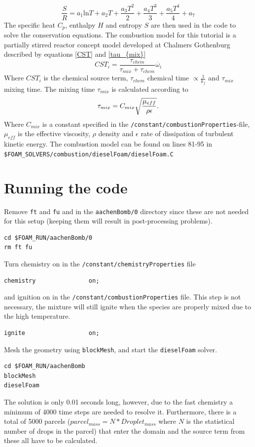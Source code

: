 \documentclass{report}
\begin{document}
\begin{equation}
\label{S}
 \frac{S}{R}  = a_1 \text{ln}T + a_{2} T + \frac{a_{3} T^2}{2} + \frac{a_4 T^3 }{3} + \frac{a_5 T^4}{4} + a_7
\end{equation}
The specific heat $C_{p}$, enthalpy $H$ and entropy $S$ are then used in the code to solve the conservation equations.
\newline
\newline
\noindent
The combustion model for this tutorial is a partially stirred reactor concept model developed at Chalmers Gothenburg described by equations \ref{CST} and \ref{tau_{mix}}
\begin{equation}
\label{CST}
	CST_{i}=\frac{\tau_{chem}}{\tau_{mix}+\tau_{chem}}\dot{\omega_i}
\end{equation}
Where $CST_{i}$ is the chemical source term, $\tau_{chem}$ chemical time $\propto \frac{1}{k_{f}}$ and $\tau_{mix}$ mixing time.
The mixing time $\tau_{mix}$ is calculated according to 
\begin{equation}
\label{tau_{mix}}
	\tau_{mix}= C_{mix}\sqrt{\frac{\mu_{eff}}{\rho  \epsilon}}.
\end{equation}
Where $C_{mix}$ is a constant specified in the \verb+/constant/combustionProperties+-file,  $\mu_{eff}$ is the effective viscosity, $\rho$ density and $\epsilon$ rate of dissipation of turbulent kinetic energy. The combustion model can be found on lines 81-95 in \verb+$FOAM_SOLVERS/combustion/dieselFoam/dieselFoam.C+


\section{Running the code}
Remove \verb+ft+ and \verb+fu+ and in the \verb+aachenBomb/0+ directory since these are not needed for this setup (keeping them will result in post-processing problems).  
\begin{verbatim}
cd $FOAM_RUN/aachenBomb/0
rm ft fu 
\end{verbatim} 
Turn chemistry on in the \verb+/constant/chemistryProperties+ file
\begin{verbatim}
chemistry               on;
\end{verbatim} 
\noindent
and ignition on in the \verb+/constant/combustionProperties+  file. This step is not necessary, the mixture will still ignite when the species are properly mixed due to the high temperature. 
\begin{verbatim}
ignite              	on;
\end{verbatim} 
Mesh the geometry using \verb+blockMesh+, and start the \verb+dieselFoam+ solver.
\begin{verbatim}
cd $FOAM_RUN/aachenBomb
blockMesh
dieselFoam              	
\end{verbatim} 
The solution is only 0.01 seconds long, however, due to the fast chemistry a minimum of 4000 time steps are needed to resolve it. Furthermore, there is a total of 5000 parcels ($parcel_{mass} = N*Droplet_{mass}$ where $N$ is the statistical number of drops in the parcel) that enter the domain and the source term from these all have to be calculated.  
\end{document}
